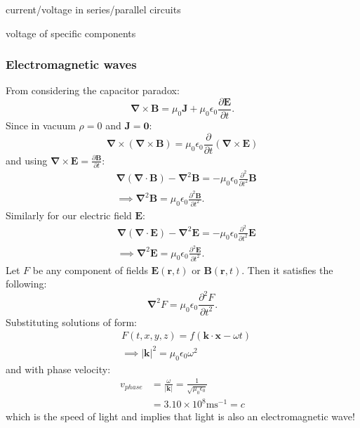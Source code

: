 \documentclass{article}
\newcommand{\vc}[1]{\boldsymbol{#1}}
\begin{document}
\begin{multicols*}{3}
current/voltage in series/parallel circuits

voltage of specific components

\subsubsection*{Electromagnetic waves}
From considering the capacitor paradox:
$$\vc{\nabla}\times\vc{B}=\mu_0\vc{J}
+\mu_0\epsilon_0\frac{\partial\vc{E}}{\partial t}.$$
Since in vacuum $\rho=0$ and $\vc{J}=\vc{0}$:
$$\vc{\nabla}\times(\vc{\nabla}\times\vc{B})
=\mu_0\epsilon_0\frac{\partial}
{\partial t}(\vc{\nabla}\times\vc{E})$$
and using $\displaystyle\vc{\nabla}\times\vc{E}
=\frac{\partial\vc{B}}{\partial t}$:
\begin{align*}
    &\vc{\nabla}(\vc{\nabla}\cdot\vc{B})
    -\vc{\nabla}^2\vc{B}=-\mu_0\epsilon_0\frac{\partial^2}
    {\partial t^2}\vc{B} \\
    &\implies\vc{\nabla}^2\vc{B}=\mu_0\epsilon_0
    \frac{\partial^2\vc{B}}{\partial t^2}.
\end{align*}
Similarly for our electric field $\vc{E}$:
\begin{align*}
    &\vc{\nabla}(\vc{\nabla}\cdot\vc{E})
    -\vc{\nabla}^2\vc{E}=-\mu_0\epsilon_0\frac{\partial^2}
    {\partial t^2}\vc{E} \\
    &\implies\vc{\nabla}^2\vc{E}=\mu_0\epsilon_0
    \frac{\partial^2\vc{E}}{\partial t^2}.
\end{align*}
Let $F$ be any component of fields $\vc{E}(\vc{r},t)$
or $\vc{B}(\vc{r},t)$. Then it satisfies the following:
$$\vc{\nabla}^2F=\mu_0\epsilon_0\frac{\partial^2F}{\partial t^2}.$$
Substituting solutions of form:
\begin{align*}
    &F(t,x,y,z)=f(\vc{k}\cdot\vc{x}-\omega t) \\
    &\implies|\vc{k}|^2=\mu_0\epsilon_0\omega^2
\end{align*}
and with phase velocity:
\begin{align*}
    v_{phase}&=\frac{\omega}{|\vc{k}|}
    =\frac{1}{\sqrt{\mu_0\epsilon_0}} \\
    &=3.10\times10^8\text{ms}^{-1}=c
\end{align*}
which is the speed of light and implies that light
is also an electromagnetic wave!


\end{multicols*}
\end{document}
